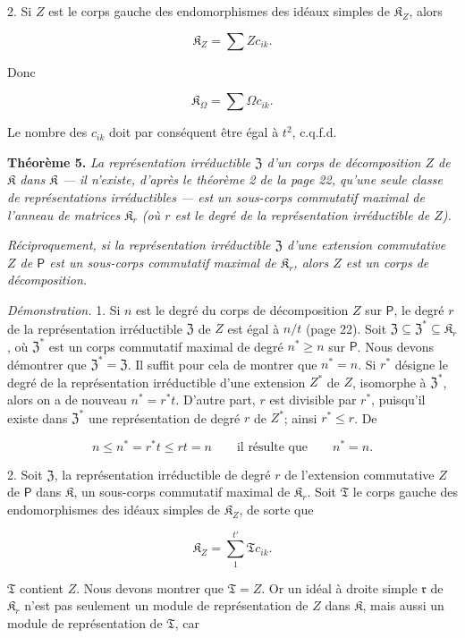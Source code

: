 2. Si \(Z\) est le corps gauche des endomorphismes des idéaux simples de \(\mathfrak K_Z\), alors

\[
\mathfrak K_Z=\sum Zc_{ik}.
\]

Donc

\[
\mathfrak K_\Omega=\sum\Omega c_{ik}.
\]

Le nombre des \(c_{ik}\) doit par conséquent être égal à \(t^2\), c.q.f.d.

\textbf{Théorème 5.} \emph{La représentation irréductible \(\mathfrak Z\) d'un corps de décomposition \(Z\) de \(\mathfrak K\) dans \(\mathfrak K\) --- il n'existe, d'après le théorème 2 de la page 22, qu'une seule classe de représentations irréductibles --- est un sous-corps commutatif maximal de l'anneau de matrices \(\mathfrak K_r\) (où \(r\) est le degré de la représentation irréductible de \(Z\)).}

\emph{Réciproquement, si la représentation irréductible \(\mathfrak Z\) d'une extension commutative \(Z\) de \(\mathsf P\) est un sous-corps commutatif maximal de \(\mathfrak K_r\), alors \(Z\) est un corps de décomposition.}

\emph{Démonstration.} 1. Si \(n\) est le degré du corps de décomposition \(Z\) sur \(\mathsf P\), le degré \(r\) de la représentation irréductible \(\mathfrak Z\) de \(Z\) est égal à \(n/t\) (page 22). Soit \(\mathfrak Z\subseteq\mathfrak Z^*\subseteq\mathfrak K_r\), où \(\mathfrak Z^*\) est un corps commutatif maximal de degré \(n^*\geq n\) sur \(\mathsf P\). Nous devons démontrer que \(\mathfrak Z^*=\mathfrak Z\). Il suffit pour cela de montrer que \(n^*=n\). Si \(r^*\) désigne le degré de la représentation irréductible d'une extension \(Z^*\) de \(Z\), isomorphe à \(\mathfrak Z^*\), alors on a de nouveau \(n^*=r^*t\). D'autre part, \(r\) est divisible par \(r^*\), puisqu'il existe dans \(\mathfrak Z^*\) une représentation de degré \(r\) de \(Z^*\); ainsi \(r^*\leq r\). De

\[
n\leq n^*=r^*t\leq rt=n
\qquad\text{il résulte que}\qquad n^*=n.
\]

2. Soit \(\mathfrak Z\), la représentation irréductible de degré \(r\) de l'extension commutative \(Z\) de \(\mathsf P\) dans \(\mathfrak K\), un sous-corps commutatif maximal de \(\mathfrak K_r\). Soit \(\mathfrak T\) le corps gauche des endomorphismes des idéaux simples de \(\mathfrak K_Z\), de sorte que

\[
\mathfrak K_Z=\sum_{1}^{t'}\mathfrak T c_{ik}.
\]

\(\mathfrak T\) contient \(Z\). Nous devons montrer que \(\mathfrak T=Z\). Or un idéal à droite simple \(\mathfrak r\) de \(\mathfrak K_r\) n'est pas seulement un module de représentation de \(Z\) dans \(\mathfrak K\), mais aussi un module de représentation de \(\mathfrak T\), car

